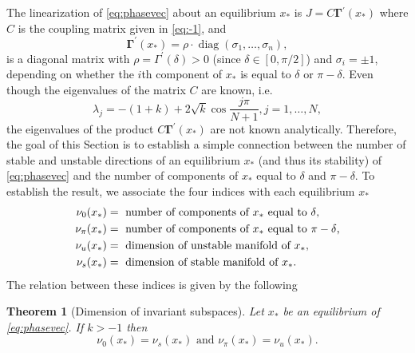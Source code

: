 \documentclass[aps,pre,twocolumn,a4paper,showkeys,showpacs]{revtex4}\usepackage{color}
\theoremstyle{plain}
\newtheorem{thm}{Theorem}
\theoremstyle{plain}
\begin{document}
The linearization of \eqref{eq:phasevec} about an equilibrium $x_{*}$ is
$J=C\mathbf{\boldsymbol{\Gamma\mathrm{^{\prime}}}}(x_{*})$ where $C$ is the
coupling matrix given in \eqref{eq:-1}, and\begin{equation}
\boldsymbol{\Gamma}^{\prime}(x_{*})=\rho\cdot\operatorname{diag}(\sigma
_{1},\dotsc,\sigma_{n}),
\end{equation}
is a diagonal matrix with $\rho=\Gamma^{\prime}(\delta)>0$ (since $\delta
\in[0,\pi/2]$) and $\sigma_{i}=\pm1$, depending on whether the $i$th component
of $x_{*}$ is equal to $\delta$ or $\pi-\delta$. Even though the eigenvalues
of the matrix $C$ are known, i.e.
\begin{equation}
\lambda_{j}=-(1+k)+2\sqrt{k}\cos\frac{j\pi}{N+1},\mbox{}j=1,\dots,N,
\end{equation}
the eigenvalues of the product $C\mathbf{\boldsymbol{\Gamma\mathrm{^{\prime}}}}(x_{\ast})$ are not known analytically. Therefore, the goal of this Section
is to establish a simple connection between the number of stable and unstable
directions of an equilibrium $x_{\ast}$ (and thus its stability) of
\eqref{eq:phasevec} and the number of components of $x_{\ast}$ equal to
$\delta$ and $\pi-\delta$. To establish the result, we associate the four
indices with each equilibrium $x_{\ast}$
\begin{equation}\begin{split}
\nu_{0}(x_{\ast}) &
=\ \mbox{number of components of \ensuremath{x_{*}} equal to \ensuremath{\delta},}\\
\nu_{\pi}(x_{\ast}) &
=\ \mbox{number of components of \ensuremath{x_{*}} equal to \ensuremath{\pi-\delta},}\\
\nu_{u}(x_{\ast}) &
=\ \mbox{dimension of unstable manifold of \ensuremath{x_{*}},}\\
\nu_{s}(x_{\ast}) &
=\ \mbox{dimension of stable manifold of \ensuremath{x_{*}}.}
\end{split}
\label{eq:class}\end{equation}
The relation between these indices is given by the following

\begin{thm}
[Dimension of invariant subspaces]\label{thm:invdim} Let $x_{*}$ be an
equilibrium of \eqref{eq:phasevec}. If $k>-1$ then
\begin{equation}
\nu_{0}(x_{*})=\nu_{s}(x_{*})\mbox{\ and\ }\nu_{\pi}(x_{*})=\nu_{u}(x_{*})\mbox{.}\label{eq:kgtm}\end{equation}

\end{thm}
\end{document}
